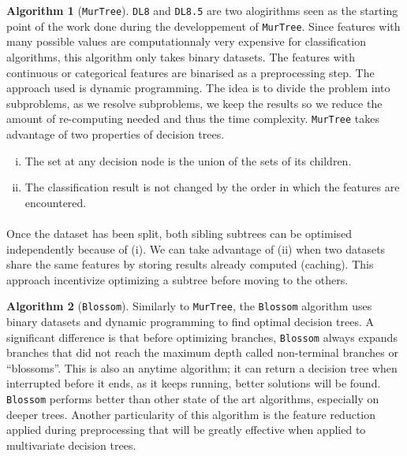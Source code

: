 \documentclass[12pt]{report}
\theoremstyle{definition}
\theoremstyle{definition}
\newtheorem*{algo}{Algorithm}
\theoremstyle{definition}
\begin{document}
\begin{algo}[\texttt{MurTree\cite{murtree}}]
    \texttt{DL8} and \texttt{DL8.5} are two alogirithms seen as the starting point of the work done during the
    developpement of \texttt{MurTree}. Since features with many possible values are computationnaly very expensive
    for classification algorithms, this algorithm only takes binary datasets. The features with continuous or categorical
    features are binarised as a preprocessing step. The approach used is dynamic programming. The idea is to divide the
    problem into subproblems, as we resolve subproblems, we keep the results so we reduce the amount of re-computing
    needed and thus the time complexity. \texttt{MurTree} takes advantage of two properties of decision trees. 
    
    \begin{enumerate}[(i)]
        \item The set at any decision node is the union of the sets of its children.
        \item The classification result is not changed by the order in which the features are encountered.
    \end{enumerate}

    \paragraph{} Once the dataset has been split, both sibling subtrees can be optimised independently because of (i).
    We can take advantage of (ii) when two datasets share the same features by storing results already computed (caching).
    This approach incentivize optimizing a subtree before moving to the others.
\end {algo}

\begin{algo}[\texttt{Blossom\cite{blossom}}]
    Similarly to \texttt{MurTree}, the \texttt{Blossom} algorithm uses binary datasets and dynamic programming to find
    optimal decision trees. A significant difference is that before optimizing branches, \texttt{Blossom} always expands
    branches that did not reach the maximum depth called non-terminal branches or ``blossoms''. This is also an anytime
    algorithm; it can return a decision tree when interrupted before it ends, as it keeps running, better solutions will
    be found. \texttt{Blossom} performs better than other state of the art algorithms, especially on deeper trees.
    Another particularity of this algorithm is the feature reduction applied during preprocessing that will be greatly
    effective when applied to multivariate decision trees.

\end {algo}
\end{document}
